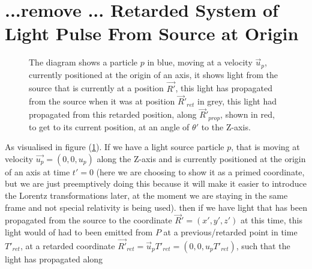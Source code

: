 \section{...remove ... Retarded System of Light Pulse From Source at Origin}

\begin{figure}[ht]
\centering
{}
\caption{The diagram shows a particle $p$ in blue, moving at a velocity $\Vec{u}_p$, currently positioned at the origin of an axis, it shows light from the source that is currently at a position $\Vec{R'}$, this light has propagated from the source when it was at position $\Vec{R}'_{ret}$ in grey, this light had propagated from this retarded position, along $\Vec{R}'_{prop}$, shown in red, to get to its current position, at an angle of $\theta '$ to the Z-axis.  }
\label{fig: Retarded field outward field}
\end{figure}

As visualised in figure (\ref{fig: Retarded field outward field}). If we have a light source particle $p$, that is moving at velocity $\vec{u_p}=(0,0,u_p)$ along the Z-axis and is currently positioned at the origin of an axis at time $t'=0$ (here we are choosing to show it as a primed coordinate, but we are just preemptively doing this because it will make it easier to introduce the Lorentz transformations later, at the moment we are staying in the same frame and not special relativity is being used). then if we have light that has been propagated from the source to the coordinate $\Vec{R}'= (x',y',z')$ at this time, this light would of had to been emitted from $P$ at a previous/retarded point in time $T'_{ret}$, at a retarded coordinate $\Vec{R'}_{ret}= \Vec{u}_p T'_{ret}=(0,0,u_p T'_{ret})$, such that the light has propagated along

